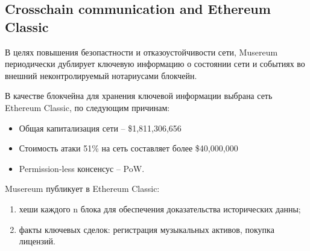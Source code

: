 \documentclass[12pt]{report}
\begin{document}
\subsection{Crosschain communication and Ethereum Classic}
\label{tech-blockchain-anchoring}
\begin{multicols}{2}
В целях повышения безопастности и отказоустойчивости сети, Musereum периодически дублирует ключевую информацию о состоянии сети и событиях во внешний неконтролируемый нотариусами блокчейн. 

В качестве блокчейна для хранения ключевой информации выбрана сеть Ethereum Classic, по следующим причинам:
\begin{itemize}
	\item Общая капитализация сети – \$1,811,306,656
	\item Стоимость атаки 51\% на сеть составляет более \$40,000,000
	\item Permission-less консенсус – PoW.
\end{itemize}

Musereum публикует в Ethereum Classic:
\begin{enumerate}
	\item хеши каждого n блока для обеспечения доказательства исторических данны;
	\item факты ключевых сделок: регистрация музыкальных активов, покупка лицензий.
\end{enumerate}
\end{multicols}
\end{document}
